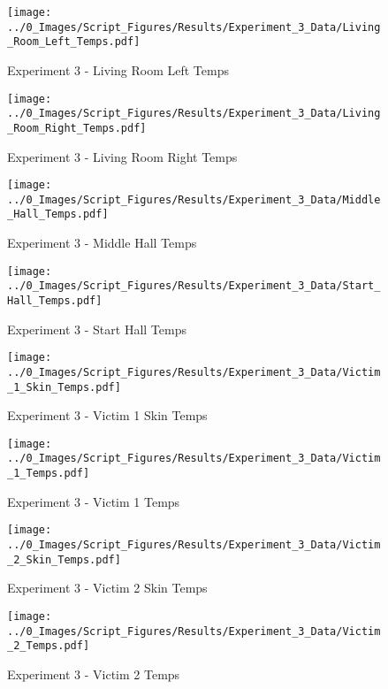 	\clearpage

	\begin{figure}[H]
		\centering
		\texttt{[image: ../0\_Images/Script\_Figures/Results/Experiment\_3\_Data/Living\_Room\_Left\_Temps.pdf]}
		\caption[]{Experiment 3 - Living Room Left Temps}
	\end{figure}
 

	\begin{figure}[H]
		\centering
		\texttt{[image: ../0\_Images/Script\_Figures/Results/Experiment\_3\_Data/Living\_Room\_Right\_Temps.pdf]}
		\caption[]{Experiment 3 - Living Room Right Temps}
	\end{figure}
 
	\clearpage

	\begin{figure}[H]
		\centering
		\texttt{[image: ../0\_Images/Script\_Figures/Results/Experiment\_3\_Data/Middle\_Hall\_Temps.pdf]}
		\caption[]{Experiment 3 - Middle Hall Temps}
	\end{figure}
 

	\begin{figure}[H]
		\centering
		\texttt{[image: ../0\_Images/Script\_Figures/Results/Experiment\_3\_Data/Start\_Hall\_Temps.pdf]}
		\caption[]{Experiment 3 - Start Hall Temps}
	\end{figure}
 
	\clearpage

	\begin{figure}[H]
		\centering
		\texttt{[image: ../0\_Images/Script\_Figures/Results/Experiment\_3\_Data/Victim\_1\_Skin\_Temps.pdf]}
		\caption[]{Experiment 3 - Victim 1 Skin Temps}
	\end{figure}
 

	\begin{figure}[H]
		\centering
		\texttt{[image: ../0\_Images/Script\_Figures/Results/Experiment\_3\_Data/Victim\_1\_Temps.pdf]}
		\caption[]{Experiment 3 - Victim 1 Temps}
	\end{figure}
 
	\clearpage

	\begin{figure}[H]
		\centering
		\texttt{[image: ../0\_Images/Script\_Figures/Results/Experiment\_3\_Data/Victim\_2\_Skin\_Temps.pdf]}
		\caption[]{Experiment 3 - Victim 2 Skin Temps}
	\end{figure}
 

	\begin{figure}[H]
		\centering
		\texttt{[image: ../0\_Images/Script\_Figures/Results/Experiment\_3\_Data/Victim\_2\_Temps.pdf]}
		\caption[]{Experiment 3 - Victim 2 Temps}
	\end{figure}
 
